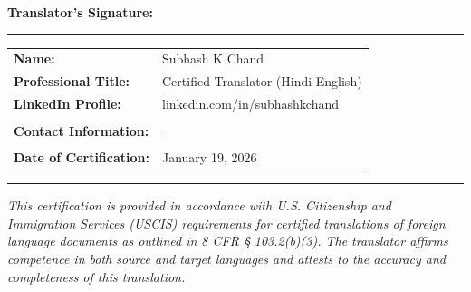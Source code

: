 \documentclass[12pt,letterpaper]{article}
\begin{document}
\vspace{0.8cm}

\noindent\textbf{Translator's Signature:} \rule{7cm}{0.4pt}

\vspace{0.5cm}

\noindent
\begin{tabular}{ll}
\textbf{Name:} & Subhash K Chand \\[0.3cm]
\textbf{Professional Title:} & Certified Translator (Hindi-English) \\[0.3cm]
\textbf{LinkedIn Profile:} & linkedin.com/in/subhashkchand \\[0.3cm]
\textbf{Contact Information:} & \rule{6cm}{0.4pt} \\[0.3cm]
\textbf{Date of Certification:} & January 19, 2026 \\
\end{tabular}

\vspace{1cm}

\noindent\rule{\textwidth}{1.5pt}

\vspace{0.3cm}

\begin{center}
\textit{\small This certification is provided in accordance with U.S. Citizenship and Immigration Services (USCIS) requirements for certified translations of foreign language documents as outlined in 8 CFR § 103.2(b)(3). The translator affirms competence in both source and target languages and attests to the accuracy and completeness of this translation.}
\end{center}
\end{document}
